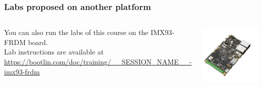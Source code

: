 \begin{frame}
\frametitle{Labs proposed on another platform}
  \begin{columns}
    You can also run the labs of this course on the IMX93-FRDM board.\\
    \vspace{1em}
    Lab instructions are available at\\
    {\small \url{https://bootlin.com/doc/training/__SESSION_NAME__-imx93-frdm}}
    \begin{center}
      \includegraphics[width=\textwidth]{../slides/imx93-frdm-board-also-supported/imx93-frdm.png}
    \end{center}
  \end{columns}
\end{frame}